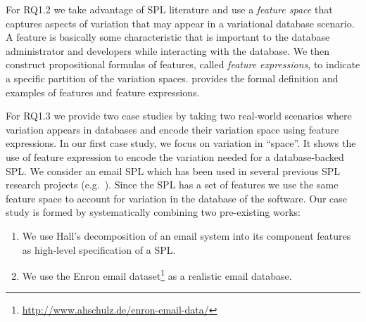 \begin{comment}
* introduce a feature space
* propositional formulas of features
\end{comment}

For RQ1.2 we take advantage of SPL literature and use a \emph{feature space} 
that captures aspects of 
variation that may appear in a variational database scenario. A feature is
basically some characteristic that is important to the database administrator
and developers while interacting with the database.
We then construct propositional formulas of features, called \emph{feature expressions},
to indicate a specific partition of the variation spaces.
 provides the formal definition and examples of
features and feature expressions.


For RQ1.3 we provide two case studies by taking 
two real-world scenarios where variation appears
in databases and encode their variation space using feature expressions.
%
In our first case study, we focus on variation in ``space''.
It shows the use of feature expression to encode the variation
needed for a database-backed SPL. We consider an email
SPL which has been used in several previous SPL research projects (e.g.\
\cite{Apel13:SSP,AlHaj19}).
Since the SPL has a set of features we use the same feature space 
to account for variation in the database of the software.
%
%
Our case study is formed by systematically combining two pre-existing works:
%
\begin{enumerate}
%
\item 
We use Hall's decomposition of an email system into its component
features~\cite{Hall05} as high-level specification of a SPL.
%
\item 
We use the Enron email
dataset\footnote{\url{http://www.ahschulz.de/enron-email-data/}} as 
a realistic email database.
\end{enumerate}


